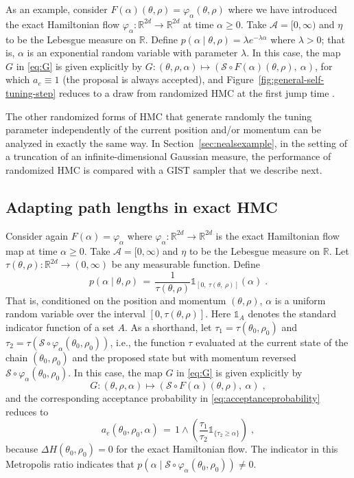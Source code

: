 \documentclass[letterpaper,11pt]{article}
\theoremstyle{plain}%
\theoremstyle{remark}
\begin{document}
As an example, consider $F(\alpha)(\theta, \rho) = \varphi_\alpha(\theta, \rho)$ where we have introduced the exact Hamiltonian flow $\varphi_{\alpha}: \mathbb{R}^{2d} \to \mathbb{R}^{2d}$ at time $\alpha \ge 0$. Take $\mathcal{A} = [0, \infty)$ and $\eta$ to be the Lebesgue measure on $\mathbb{R}$. Define $p(\alpha \mid \theta, \rho) = \lambda e^{- \lambda \alpha}$ where $\lambda > 0$; that is, $\alpha$ is an exponential random variable with parameter $\lambda$.  In this case, the map $G$ in \eqref{eq:G} is given explicitly by $G : (\theta, \rho, \alpha) \mapsto ( \mathcal{S} \circ F(\alpha)(\theta, \rho), \ \alpha)$, for which $a_e \equiv 1$ (the proposal is always accepted), and Figure~\ref{fig:general-self-tuning-step} reduces to a draw from randomized HMC at the first jump time \cite{BoSa2017,BoEb2022}.

The other randomized forms of HMC that generate randomly the tuning parameter independently of the current position and/or momentum can be analyzed in exactly the same way.  In Section~\ref{sec:nealsexample}, in the setting of a truncation of an infinite-dimensional Gaussian measure, the performance of randomized HMC is compared with a GIST sampler that we describe next. 

\subsection{Adapting path lengths in exact HMC}\label{ex:exact_stHMC}

Consider again $F(\alpha) = \varphi_\alpha$ where  $\varphi_{\alpha}: \mathbb{R}^{2d} \to \mathbb{R}^{2d}$ is the exact Hamiltonian flow map at time $\alpha \ge 0$.  Take $\mathcal{A} = [0, \infty)$ and $\eta$ to be the Lebesgue measure on $\mathbb{R}$.  Let $\tau(\theta, \rho):\mathbb{R}^{2d} \to (0, \infty)$ be any measurable function.   Define \[ p(\alpha \mid \theta, \rho) \, = \,  \dfrac{1}{\tau(\theta, \rho)} \mathds{1}_{[0, \ \tau(\theta, \ \rho)]}( \alpha ) \;.
\] That is, conditioned on the position and momentum $(\theta, \rho)$, $\alpha$ is a uniform random variable over the interval  $[0,\tau(\theta, \rho)]$.  Here $\mathds{1}_A$ denotes the standard indicator function of a set $A$.  As a shorthand, let $\tau_1 = \tau(\theta_0, \rho_0)$ and $\tau_2 = \tau(\mathcal{S} \circ \varphi_{\alpha}(\theta_0, \rho_0))$, i.e., the function $\tau$ evaluated at the current state of the chain $(\theta_0, \rho_0)$ and the proposed state but with momentum reversed $\mathcal{S} \circ \varphi_{\alpha}(\theta_0, \rho_0)$.
In this case, the map $G$ in \eqref{eq:G} is given explicitly by \[
G : (\theta, \rho, \alpha) \mapsto ( \mathcal{S} \circ F(\alpha)(\theta, \rho), \ \alpha) \;, 
\] and the corresponding acceptance probability in \eqref{eq:acceptanceprobability} reduces to \[ a_e(\theta_0, \rho_0, \alpha) \, = \, 1 \wedge \left( \frac{\tau_1}{\tau_2} \mathds{1}_{ \{  \tau_2 \geq \alpha \} } \right) \;, \] because $\Delta H(\theta_0, \rho_0) = 0$ for the exact Hamiltonian flow.  The indicator in this Metropolis ratio indicates that  $p(\alpha \mid \mathcal{S} \circ \varphi_{\alpha}(\theta_0, \rho_0)) \ne 0$.
\end{document}
